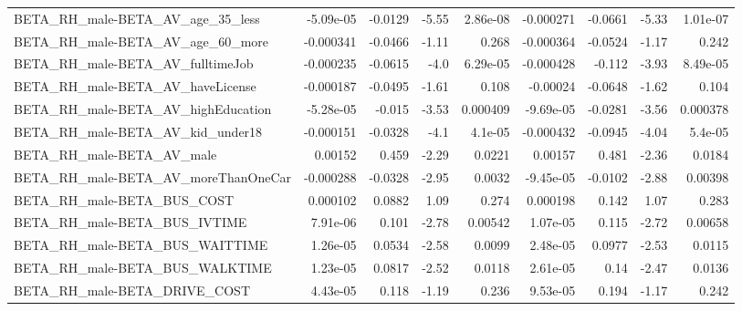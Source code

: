 \begin{tabular}{lrrrrrrrr}
BETA\_RH\_male-BETA\_AV\_age\_35\_less                   &   -5.09e-05 &      -0.0129 &     -5.55 & 2.86e-08 &  -0.000271 &     -0.0661 &        -5.33 &      1.01e-07 \\
BETA\_RH\_male-BETA\_AV\_age\_60\_more                   &   -0.000341 &      -0.0466 &     -1.11 &    0.268 &  -0.000364 &     -0.0524 &        -1.17 &         0.242 \\
BETA\_RH\_male-BETA\_AV\_fulltimeJob                   &   -0.000235 &      -0.0615 &      -4.0 & 6.29e-05 &  -0.000428 &      -0.112 &        -3.93 &      8.49e-05 \\
BETA\_RH\_male-BETA\_AV\_haveLicense                   &   -0.000187 &      -0.0495 &     -1.61 &    0.108 &   -0.00024 &     -0.0648 &        -1.62 &         0.104 \\
BETA\_RH\_male-BETA\_AV\_highEducation                 &   -5.28e-05 &       -0.015 &     -3.53 & 0.000409 &  -9.69e-05 &     -0.0281 &        -3.56 &      0.000378 \\
BETA\_RH\_male-BETA\_AV\_kid\_under18                   &   -0.000151 &      -0.0328 &      -4.1 &  4.1e-05 &  -0.000432 &     -0.0945 &        -4.04 &       5.4e-05 \\
BETA\_RH\_male-BETA\_AV\_male                          &     0.00152 &        0.459 &     -2.29 &   0.0221 &    0.00157 &       0.481 &        -2.36 &        0.0184 \\
BETA\_RH\_male-BETA\_AV\_moreThanOneCar                &   -0.000288 &      -0.0328 &     -2.95 &   0.0032 &  -9.45e-05 &     -0.0102 &        -2.88 &       0.00398 \\
BETA\_RH\_male-BETA\_BUS\_COST                         &    0.000102 &       0.0882 &      1.09 &    0.274 &   0.000198 &       0.142 &         1.07 &         0.283 \\
BETA\_RH\_male-BETA\_BUS\_IVTIME                       &    7.91e-06 &        0.101 &     -2.78 &  0.00542 &   1.07e-05 &       0.115 &        -2.72 &       0.00658 \\
BETA\_RH\_male-BETA\_BUS\_WAITTIME                     &    1.26e-05 &       0.0534 &     -2.58 &   0.0099 &   2.48e-05 &      0.0977 &        -2.53 &        0.0115 \\
BETA\_RH\_male-BETA\_BUS\_WALKTIME                     &    1.23e-05 &       0.0817 &     -2.52 &   0.0118 &   2.61e-05 &        0.14 &        -2.47 &        0.0136 \\
BETA\_RH\_male-BETA\_DRIVE\_COST                       &    4.43e-05 &        0.118 &     -1.19 &    0.236 &   9.53e-05 &       0.194 &        -1.17 &         0.242 \\

\end{tabular}
